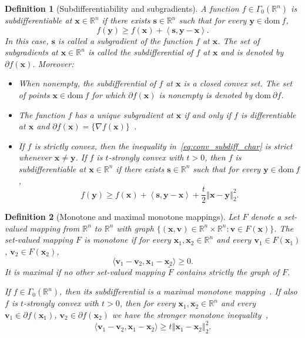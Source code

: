 \documentclass[11pt]{article}
\numberwithin{prop}{section}
\numberwithin{lem}{section}
\numberwithin{rem}{section}
\numberwithin{cor}{section}
\numberwithin{thm}{section}
\newtheorem{defn}{Definition}
\numberwithin{defn}{section}
\numberwithin{fact}{section}
\theoremstyle{plain}
\def\bs {\boldsymbol{s}}
\def\bv {\boldsymbol{v}}
\def\bx {\boldsymbol{x}}
\def\by {\boldsymbol{y}}
\def\R {\mathbb{R}}
\newcommand{\normsq}[1]{\left\Vert{#1} \right\Vert_{2}^{2}}
\def\dom {\mathrm{dom~}}    %
\def\Rn {\R^n}
\def\gmRn {\Gamma_0(\Rn)}   %
\begin{document}
\begin{defn}[Subdifferentiability and subgradients]\label{def:subgrad}
A function $f \in \gmRn$ is subdifferentiable at $\bx \in \Rn$ if there exists $\bs \in \Rn$ such that for every $\by \in \dom f$,
\begin{equation}\label{eq:conv_subdiff_char}
f(\by) \geqslant f(\bx) + \left\langle\bs,\by-\bx \right\rangle.
\end{equation}
In this case, $\bs$ is called a subgradient of the function $f$ at $\bx$. The set of subgradients at $\bx \in \Rn$ is called the subdifferential of $f$ at $\bx$ and is denoted by $\partial f(\bx)$. Moreover:
\begin{itemize}
    \item[(i)] When nonempty, the subdifferential of $f$ at $\bx$ is a closed convex set. The set of points $\bx \in \dom f$ for which $\partial f(\bx)$ is nonempty is denoted by $\dom \partial f$.
    \item[(ii)] The function $f$ has a unique subgradient at $\bx$ if and only if $f$ is differentiable at $\bx$ and $\partial f(\bx) = \{\nabla f(\bx)\}$~\cite[Proposition 5.3, page 23]{ekeland1999convex}.

    \item[(iii)] If $f$ is strictly convex, then the inequality in~\eqref{eq:conv_subdiff_char} is strict whenever $\bx \neq \by$. If $f$ is $t$-strongly convex with $t>0$, then $f$ is subdifferentiable at $\bx \in \Rn$ if there exists $\bs \in \Rn$ such that for every $\by \in \dom f$,
    \begin{equation}\label{eq:sc_subdiff_char}
    f(\by) \geqslant f(\bx) + \left\langle \bs,\by-\bx\right\rangle + \frac{t}{2}\normsq{\bx-\by}.
    \end{equation}
\end{itemize}
\end{defn}
%
\begin{defn}[Monotone and maximal monotone mappings]\label{def:mmm}
Let $F$ denote a set-valued mapping from $\Rn$ to $\Rn$ with \textit{graph} $\{(\bx,\bv) \in \Rn \times \Rn \colon \bv \in F(\bx)\}$. The set-valued mapping $F$ is \textit{monotone} if for every $\bx_{1},\bx_{2} \in \Rn$ and every $\bv_{1} \in F(\bx_{1})$, $\bv_{2} \in F(\bx_{2})$,
\begin{equation}\label{eq:monotone_inequality}
\langle\bv_{1}-\bv_{2},\bx_{1}-\bx_{2}\rangle \geqslant 0.
\end{equation}
It is \textit{maximal} if no other set-valued mapping $\tilde{F}$ contains strictly the graph of $F$.

If $f \in \gmRn$, then its subdifferential is a maximal monotone mapping~\cite[Theorem 12.17]{rockafellar2009variational}. If also $f$ is $t$-strongly convex with $t>0$, then for every $\bx_{1},\bx_{2} \in \Rn$ and every $\bv_{1} \in \partial f(\bx_{1})$, $\bv_{2} \in \partial f(\bx_{2})$ we have the stronger monotone inequality~\cite[Corollary 31.5.2]{rockafellar1997convex},
\begin{equation}\label{eq:stronger_monotone_inequality}
\langle\bv_{1}-\bv_{2},\bx_{1}-\bx_{2}\rangle \geqslant t\normsq{\bx_{1}-\bx_{2}}.
\end{equation}
\end{defn}
\end{document}
